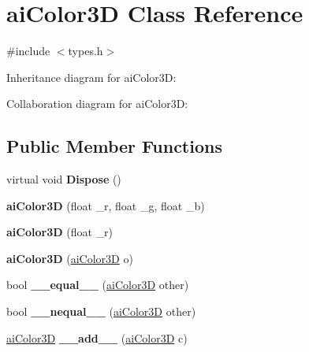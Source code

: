 \hypertarget{structai_color3_d}{\section{ai\+Color3\+D Class Reference}
\label{structai_color3_d}
}


{\ttfamily \#include $<$types.\+h$>$}



Inheritance diagram for ai\+Color3\+D\+:


Collaboration diagram for ai\+Color3\+D\+:
\subsection*{Public Member Functions}
\begin{DoxyCompactItemize}
\item 
\hypertarget{structai_color3_d_aa1f05e6f8bad7821337e918ae035b68d}{virtual void {\bfseries Dispose} ()}\label{structai_color3_d_aa1f05e6f8bad7821337e918ae035b68d}

\item 
\hypertarget{structai_color3_d_a530455c814065cb50d9064e520850d51}{{\bfseries ai\+Color3\+D} (float \+\_\+r, float \+\_\+g, float \+\_\+b)}\label{structai_color3_d_a530455c814065cb50d9064e520850d51}

\item 
\hypertarget{structai_color3_d_a944e327c1d6831e119c838d2f99fe966}{{\bfseries ai\+Color3\+D} (float \+\_\+r)}\label{structai_color3_d_a944e327c1d6831e119c838d2f99fe966}

\item 
\hypertarget{structai_color3_d_a1b6925ba9c86f8f91d31478f443163b3}{{\bfseries ai\+Color3\+D} (\hyperlink{structai_color3_d}{ai\+Color3\+D} o)}\label{structai_color3_d_a1b6925ba9c86f8f91d31478f443163b3}

\item 
\hypertarget{structai_color3_d_aa35c80e3c88fe24ca8e503ef9811ab38}{bool {\bfseries \+\_\+\+\_\+equal\+\_\+\+\_\+} (\hyperlink{structai_color3_d}{ai\+Color3\+D} other)}\label{structai_color3_d_aa35c80e3c88fe24ca8e503ef9811ab38}

\item 
\hypertarget{structai_color3_d_a23c643dc21c1e16ab99d635958522a6b}{bool {\bfseries \+\_\+\+\_\+nequal\+\_\+\+\_\+} (\hyperlink{structai_color3_d}{ai\+Color3\+D} other)}\label{structai_color3_d_a23c643dc21c1e16ab99d635958522a6b}

\item 
\hypertarget{structai_color3_d_a8f9406031b4c14c4190baa0696825e26}{\hyperlink{structai_color3_d}{ai\+Color3\+D} {\bfseries \+\_\+\+\_\+add\+\_\+\+\_\+} (\hyperlink{structai_color3_d}{ai\+Color3\+D} c)}\label{structai_color3_d_a8f9406031b4c14c4190baa0696825e26}


\end{DoxyCompactItemize}
